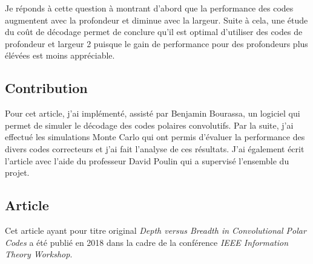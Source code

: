 Je réponds à cette question à montrant d'abord que la performance des codes 
augmentent avec la profondeur et diminue avec la largeur.
Suite à cela, une étude du coût de décodage permet de conclure qu'il est optimal
d'utiliser des codes de profondeur et largeur 2 puisque le gain de performance 
pour des profondeurs plus élévées est moins appréciable.

\subsection{Contribution}

Pour cet article,
j'ai implémenté, 
assisté par Benjamin Bourassa, 
un logiciel qui permet de simuler le décodage des codes polaires convolutifs.
Par la suite,
j'ai effectué les simulations Monte Carlo qui ont permis d'évaluer la performance
des divers codes correcteurs et j'ai fait l'analyse de ces résultats.
J'ai également écrit l'article avec l'aide du professeur David Poulin
qui a supervisé l'ensemble du projet.

\subsection{Article}

Cet article ayant pour titre original \textit{Depth versus Breadth in Convolutional Polar Codes}
a été publié en 2018 dans la cadre de la conférence \textit{IEEE Information Theory Workshop}.


